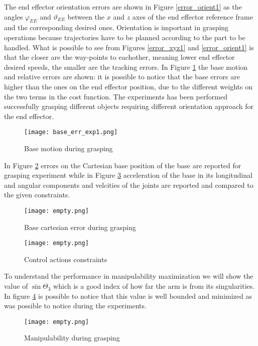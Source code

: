 The end effector orientation errors are shown in Figure \ref{error_orient1} as the angles $\varphi_{EE}$ and $\vartheta_{EE}$ between the $x$ and $z$ axes of the end effector reference frame and the corresponding desired ones. Orientation is important in grasping operations because trajectories have to be planned according to the part to be handled. What is possible to see from Figures \ref{error_xyz1} and \ref{error_orient1} is that the closer are the way-points to eachother, meaning lower end effector desired speeds, the smaller are the tracking errors. In Figure \ref{base_err_exp1} the base motion and relative errors are shown: it is possible to notice that the base errors are higher than the ones on the end effector position, due to the different weights on the two terms in the cost function.
The experiments has been performed successfully grasping different objects requiring different orientation approach for the end effector.  
\begin{figure}[h!]
\centering
\texttt{[image: base\_err\_exp1.png]}
\caption{Base motion during grasping}
\label{base_err_exp1}
\end{figure}
In Figure \ref{err_num_base} errors on the Cartesian base position of the base are reported for grasping experiment while in Figure \ref{vel_real} acceleration of the base in its longitudinal and angular components and velcities of the joints are reported and compared to the given constraints.
\begin{figure}[h!]
\centering
\texttt{[image: empty.png]}
\caption{Base cartesian error during grasping}
\label{err_num_base}
\end{figure}
\begin{figure}[h!]
\centering
\texttt{[image: empty.png]}
\caption{Control actions constraints}
\label{vel_real}
\end{figure}
To understand the performance in manipulability maximization we will show the value of $\sin\Theta_3$ which is a good index of how far the arm is from its singularities. In figure \ref{man_real1} is possible to notice that this value is well bounded and minimized as was possible to notice during the experiments.
\begin{figure}[h!]
\centering
\texttt{[image: empty.png]}
\caption{Manipulability during grasping}
\label{man_real1}
\end{figure}

